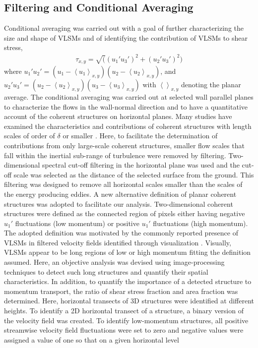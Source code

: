 \subsection{Filtering and Conditional Averaging}
Conditional averaging was carried out with a goal of further characterizing the size and shape of VLSMs and of identifying the contribution of VLSMs to shear stress, 
\begin{align}
\tau_{x,y} = \sqrt((u_{1}'u_{3}')^2+(u_{2}'u_{3}')^2)
\end{align}
where $u_{1}'u_{2}'= (u_{1} -\left< u_{1}\right >_{x,y})(u_{2} -\left< u_{2}\right >_{x,y})$, and $u_{2}'u_{3}'= (u_2 -\left< u_{2}\right >_{x,y})(u_{3} -\left< u_{3}\right >_{x,y})$ with $\left < \right >_{x,y}$ denoting the planar average. The conditional averaging was carried out at selected wall parallel planes to characterize the flows in the wall-normal direction and to have a quantitative account of the coherent structures on horizontal planes. Many studies have examined  the characteristics and contributions of coherent structures with length scales of order of $\delta$ or smaller \citep[e.g.][]{domaradzki_pof_1994, aulie_eyink_pof_2009_1}. Here, to facilitate the determination of contributions from only large-scale coherent structures, smaller flow scales that  fall within the inertial sub-range of turbulence were removed by filtering.  Two-dimensional spectral cut-off filtering in the horizontal plane was used and the cut-off scale was selected as the distance of the selected surface from the ground. This filtering was designed to remove all horizontal scales smaller than the scales  of the energy producing eddies.  A new alternative definition of planar coherent structures was adopted to facilitate our analysis. Two-dimensional coherent structures were defined as the connected region of pixels either having negative $u_{1}'$ fluctuations (low momentum) or positive $u_{1}'$ fluctuations (high momentum). The adopted definition was motivated by the commonly reported presence of VLSMs in filtered velocity fields identified through visualization \cite{hutchins_marusic_jfm2007,dennis_nickels_jfm2011}.  Visually, VLSMs appear to be long regions of low or high momentum fitting the definition assumed.  Here, an objective analysis was devised using image-processing techniques to detect such long structures and quantify their spatial characteristics. In addition, to quantify the importance of a detected structure to momentum transport, the ratio of shear stress fraction and area fraction was determined.  Here, horizontal transects of 3D structures were identified at different heights. To identify a 2D horizontal transect of a structure, a binary version of the velocity field was created. To identify low-momentum structures, all positive streamwise velocity field fluctuations were set to zero and negative values were assigned a value of one so that on a given horizontal level 

